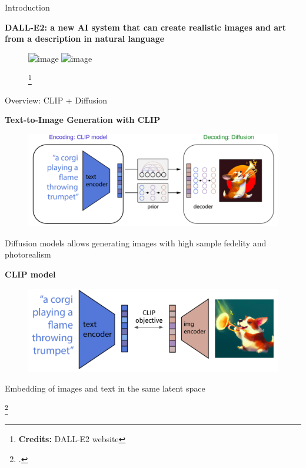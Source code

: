 \documentclass[aspectratio=169, 9pt]{beamer}
\theoremstyle{definition}
\begin{document}
\begin{frame}{Introduction}
  \begin{center}
    \bf\bf DALL-E2: a new AI system that can create realistic images and art from a 
    description in natural language
  \end{center}
  \begin{figure}[h]
    \centering
    \includegraphics<1>[clip, width=0.85\textwidth, trim=0 0 0 0]{./pic/dalle-samples2.png}%
    \includegraphics<2->[clip, width=0.85\textwidth, trim=0 0 0 1.25cm]{./pic/dalle-samples3.png}
    \caption{\footnote{\textbf{Credits:} DALL-E2 website}}
  \end{figure}
\end{frame}
\begin{frame}{Overview: CLIP + Diffusion}
  \begin{minipage}[t]{0.47\textwidth}
    \begin{center}
      \bf Text-to-Image Generation with CLIP
    \end{center}
    \begin{figure}[h]
      \centering
      \includegraphics[width=1\textwidth]{./pic/dalle-encdec.png}
    \end{figure}
    \begin{center}
      Diffusion models allows generating images with  high sample fedelity
      and photorealism
    \end{center}
  \end{minipage}\hfill%
  \begin{minipage}[t]{0.47\textwidth}
    \begin{center}
      \bf CLIP model
    \end{center}
    \begin{figure}[h]
      \vspace{0.25cm}
      \centering
      \includegraphics[width=\textwidth]{./pic/dalle-clip-intro.png}
    \end{figure}
  \begin{center}
    Embedding of images and text in the same latent space
  \end{center}
  \end{minipage}\hfill%
  \footcite{dalle2}
\end{frame}
\end{document}
